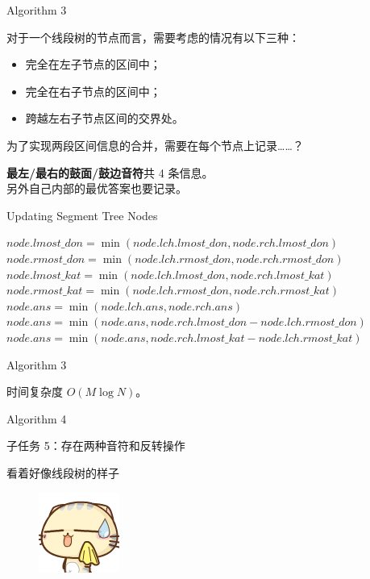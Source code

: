 \documentclass[UTF8]{beamer}
\begin{document}
\begin{frame}{Algorithm 3}

对于一个线段树的节点而言，需要考虑的情况有以下三种：
\begin{itemize}
    \item 完全在左子节点的区间中；
    \item 完全在右子节点的区间中；
    \item 跨越左右子节点区间的交界处。
\end{itemize}

\pause
为了实现两段区间信息的合并，需要在每个节点上记录……？

\pause
\textbf{最左/最右的鼓面/鼓边音符}共 4 条信息。\\
另外自己内部的最优答案也要记录。

\end{frame}

\begin{frame}{Updating Segment Tree Nodes}

\begin{algorithm}[H]
\begin{algorithmic}[1]
         \State \Return \EndIf
        \State $node.lmost\_don = \min(node.lch.lmost\_don, node.rch.lmost\_don)$
        \State $node.rmost\_don = \min(node.lch.rmost\_don, node.rch.rmost\_don)$
        \State $node.lmost\_kat = \min(node.lch.lmost\_don, node.rch.lmost\_kat)$
        \State $node.rmost\_kat = \min(node.lch.rmost\_don, node.rch.rmost\_kat)$
        \State $node.ans = \min(node.lch.ans, node.rch.ans)$
        \State $node.ans = \min(node.ans, node.rch.lmost\_don - node.lch.rmost\_don)$
        \State $node.ans = \min(node.ans, node.rch.lmost\_kat - node.lch.rmost\_kat)$
    \EndFunction
\end{algorithmic}
\caption{}
\label{alg:seq}
\end{algorithm}

\end{frame}

\begin{frame}{Algorithm 3}

时间复杂度 $O(M \log N)$。

\end{frame}

\begin{frame}{Algorithm 4}

子任务 5：存在两种音符和反转操作 \newline\newline

看着好像线段树的样子

\begin{figure}[h]\centering
\includegraphics[scale=0.5]{xx.png}
\end{figure}

\end{frame}
\end{document}
